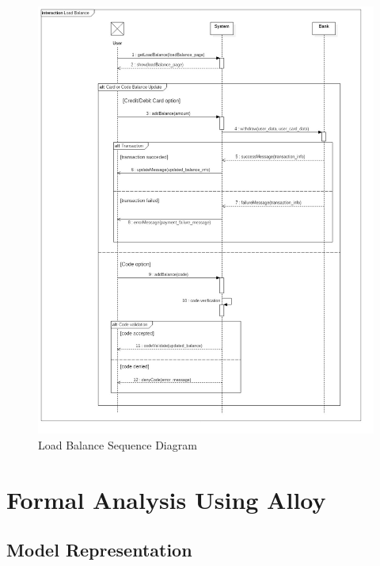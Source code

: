 \documentclass{article}
\begin{document}
\begin{figure}[H]
\includegraphics[width=\linewidth]{Load_Balance.jpg}
\caption{Load Balance Sequence Diagram}
\label{fig:SQ8}
\end{figure}

\newpage
\section{Formal Analysis Using Alloy}
\subsection{Model Representation}
\end{document}

